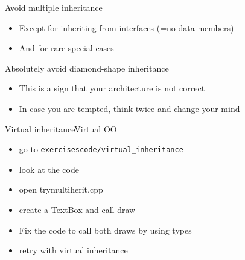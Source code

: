 \begin{frame}[fragile]
  \begin{goodpractice}{Avoid multiple inheritance}
    \begin{itemize}
      \item Except for inheriting from interfaces (=no data members)
      \item And for rare special cases
    \end{itemize}

    \hspace*{0.05\textwidth}\begin{minipage}{0.9\textwidth}
      \begin{alertblock}{Absolutely avoid diamond-shape inheritance}
        \begin{itemize}
        \item This is a sign that your architecture is not correct
        \item In case you are tempted, think twice and change your mind
        \end{itemize}
      \end{alertblock}
    \end{minipage}
  \end{goodpractice}
\end{frame}

\begin{frame}[fragile]
  \begin{exerciseWithShortcut}{Virtual inheritance}{Virtual OO}
    \begin{itemize}
    \item go to \texttt{exercisescode/virtual\_inheritance}
    \item look at the code
    \item open trymultiherit.cpp
    \item create a TextBox and call draw
    \item Fix the code to call both draws by using types
    \item retry with virtual inheritance
    \end{itemize}
  \end{exerciseWithShortcut}
\end{frame}
